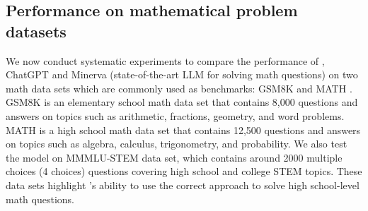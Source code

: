 \subsection{Performance on mathematical problem datasets} 
\label{subsection:pm}

We now conduct systematic experiments to compare the performance of {\DV}, ChatGPT and Minerva (state-of-the-art LLM for solving math questions) on two math data sets which are commonly used as benchmarks: GSM8K \cite{cobbe2021training} and MATH \cite{hendrycksmath2021}. GSM8K is an elementary school math data set that contains 8,000 questions and answers on topics such as arithmetic, fractions, geometry, and word problems. MATH is a high school math data set that contains 12,500 questions and answers on topics such as algebra, calculus, trigonometry, and probability. We also test the model on MMMLU-STEM data set, which contains around 2000 multiple choices (4 choices) questions covering high school and college STEM topics. These data sets highlight {\DV}'s ability to use the correct approach to solve high school-level math questions.
\begin{comment}

\paragraph{Could it be that \DV's advantage is simply due to better memorization capabilities?} One possible explanation for \DV's superior performance on solving mathematical questions is that \DV \ has a better memory than ChatGPT or other LLMs, and that it can recall the questions or solutions from its pre-training data. However, based on the examples, we have reasons to believe that \DV \ does not rely on memorization but on understanding and applying mathematical concepts and rules. Here are some of our reasons:
\begin{enumerate}
    \item In the benchmarks, we tested \DV \ by asking it to (1) write the template, (2) write down the steps first then write down the final answer. The templates are not available online, and detailed solutions for datasets such as MMMLU-STEM are also not online (only the answer is). Moreover, even when the solution is possibly online, \textbf{we often observe that \DV \ uses a different approach than the existing ones.} For example, in the $\sin(a + b)$ example, \DV \ takes several reasonable, but unnecessary steps that are not part of a standard solution.
    \item We also crafted some mathematical questions by ourselves, carefully checking that these questions or close variants do not appear online. \DV \ still solves these questions like the standard ones. 
\end{enumerate}
\end{comment}

